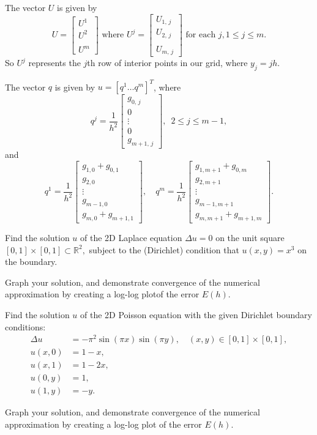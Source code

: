  The vector $U$ is given by 
 \[
 U = \begin{bmatrix} U^1 \\ U^2 \\ \\ U^m \end{bmatrix} \text{ where } U^j = 
 \begin{bmatrix} U_{1,\,j} \\ U_{2,\,j} \\ \\ U_{m,\,j} \end{bmatrix} \text{ for each } j, 1\leq j \leq m.
 \]
 So $U^j$ represents the $j$th row of interior points in our grid, where $y_j = jh.$
 
 
 The vector $q$ is given by $u = [q^1 \ldots q^m]^T$, where 
 \[
 q^j = \frac{1}{h^2}
 \begin{bmatrix} g_{0,\,j} \\ 0 \\ \vdots \\0\\ g_{m+1,\,j} \end{bmatrix} , \,\,\, 2 \leq j \leq m-1,
 \]
 and 
 \[
 q^1 = \frac{1}{h^2}\begin{bmatrix} g_{1,0} + g_{0,1} \\ g_{2,0} \\ \vdots \\ g_{m-1,0}\\ g_{m,0} + g_{m+1,1}\end{bmatrix}, \quad q^m = \frac{1}{h^2}\begin{bmatrix} g_{1,m+1} + g_{0,m}\\ g_{2,m+1} \\ \vdots \\ g_{m-1,m+1}\\ g_{m,m+1} + g_{m+1,m}\end{bmatrix}.
 \]

\begin{problem}
	Find the solution $u$ of the 2D Laplace equation $\Delta u = 0$ on the unit 
	square $[0,1]\times [0,1] \subset \mathbb{R}^2,$ subject to the (Dirichlet) condition that 
	$u(x,y) = x^3$ on the boundary. 
	 
	 Graph your solution, and demonstrate convergence of the numerical approximation by 
	 creating a log-log plotof the error $E(h).$
\end{problem}

\begin{problem}
	Find the solution $u$ of the 2D Poisson equation with the given Dirichlet boundary conditions:
	\begin{align*}
		\Delta u &= -\pi^2 \sin(\pi x)\sin(\pi y), \quad (x,y) \in [0,1]\times [0,1], \\
		u(x,0) &= 1-x, \\
		u(x,1) &= 1-2x, \\
		u(0,y) &= 1, \\
		u(1,y) &= -y. 
	\end{align*}
	
	Graph your solution, and demonstrate convergence of the numerical approximation by 
	creating a log-log plot of the error $E(h).$
\end{problem}

